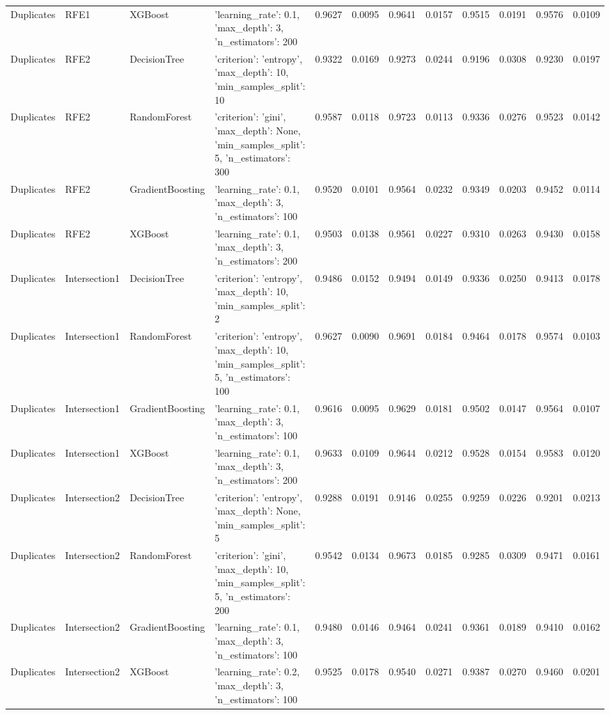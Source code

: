 \begin{tabular}{llllrrrrrrrr}
Duplicates & RFE1 & XGBoost & {'learning_rate': 0.1, 'max_depth': 3, 'n_estimators': 200} & 0.9627 & 0.0095 & 0.9641 & 0.0157 & 0.9515 & 0.0191 & 0.9576 & 0.0109 \\
Duplicates & RFE2 & DecisionTree & {'criterion': 'entropy', 'max_depth': 10, 'min_samples_split': 10} & 0.9322 & 0.0169 & 0.9273 & 0.0244 & 0.9196 & 0.0308 & 0.9230 & 0.0197 \\
Duplicates & RFE2 & RandomForest & {'criterion': 'gini', 'max_depth': None, 'min_samples_split': 5, 'n_estimators': 300} & 0.9587 & 0.0118 & 0.9723 & 0.0113 & 0.9336 & 0.0276 & 0.9523 & 0.0142 \\
Duplicates & RFE2 & GradientBoosting & {'learning_rate': 0.1, 'max_depth': 3, 'n_estimators': 100} & 0.9520 & 0.0101 & 0.9564 & 0.0232 & 0.9349 & 0.0203 & 0.9452 & 0.0114 \\
Duplicates & RFE2 & XGBoost & {'learning_rate': 0.1, 'max_depth': 3, 'n_estimators': 200} & 0.9503 & 0.0138 & 0.9561 & 0.0227 & 0.9310 & 0.0263 & 0.9430 & 0.0158 \\
Duplicates & Intersection1 & DecisionTree & {'criterion': 'entropy', 'max_depth': 10, 'min_samples_split': 2} & 0.9486 & 0.0152 & 0.9494 & 0.0149 & 0.9336 & 0.0250 & 0.9413 & 0.0178 \\
Duplicates & Intersection1 & RandomForest & {'criterion': 'entropy', 'max_depth': 10, 'min_samples_split': 5, 'n_estimators': 100} & 0.9627 & 0.0090 & 0.9691 & 0.0184 & 0.9464 & 0.0178 & 0.9574 & 0.0103 \\
Duplicates & Intersection1 & GradientBoosting & {'learning_rate': 0.1, 'max_depth': 3, 'n_estimators': 100} & 0.9616 & 0.0095 & 0.9629 & 0.0181 & 0.9502 & 0.0147 & 0.9564 & 0.0107 \\
Duplicates & Intersection1 & XGBoost & {'learning_rate': 0.1, 'max_depth': 3, 'n_estimators': 200} & 0.9633 & 0.0109 & 0.9644 & 0.0212 & 0.9528 & 0.0154 & 0.9583 & 0.0120 \\
Duplicates & Intersection2 & DecisionTree & {'criterion': 'entropy', 'max_depth': None, 'min_samples_split': 5} & 0.9288 & 0.0191 & 0.9146 & 0.0255 & 0.9259 & 0.0226 & 0.9201 & 0.0213 \\
Duplicates & Intersection2 & RandomForest & {'criterion': 'gini', 'max_depth': 10, 'min_samples_split': 5, 'n_estimators': 200} & 0.9542 & 0.0134 & 0.9673 & 0.0185 & 0.9285 & 0.0309 & 0.9471 & 0.0161 \\
Duplicates & Intersection2 & GradientBoosting & {'learning_rate': 0.1, 'max_depth': 3, 'n_estimators': 100} & 0.9480 & 0.0146 & 0.9464 & 0.0241 & 0.9361 & 0.0189 & 0.9410 & 0.0162 \\
Duplicates & Intersection2 & XGBoost & {'learning_rate': 0.2, 'max_depth': 3, 'n_estimators': 100} & 0.9525 & 0.0178 & 0.9540 & 0.0271 & 0.9387 & 0.0270 & 0.9460 & 0.0201 \\
\bottomrule
\end{tabular}
